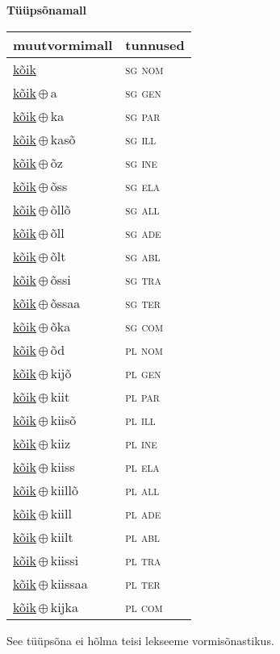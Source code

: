 

\vspace{3.5em}
\noindent \begin{minipage}{\textwidth}
\noindent \textbf{Tüüpsõnamall \,}\\

\begin{sideways}
\begin{tabular}{l l}
muutvormimall & tunnused \\
\hline
\underline{kõik} & \textsc{ sg nom } \\
\underline{kõik}\,$\oplus$\,a & \textsc{ sg gen } \\
\underline{kõik}\,$\oplus$\,ka & \textsc{ sg par } \\
\underline{kõik}\,$\oplus$\,kasõ & \textsc{ sg ill } \\
\underline{kõik}\,$\oplus$\,õz & \textsc{ sg ine } \\
\underline{kõik}\,$\oplus$\,õss & \textsc{ sg ela } \\
\underline{kõik}\,$\oplus$\,õllõ & \textsc{ sg all } \\
\underline{kõik}\,$\oplus$\,õll & \textsc{ sg ade } \\
\underline{kõik}\,$\oplus$\,õlt & \textsc{ sg abl } \\
\underline{kõik}\,$\oplus$\,õssi & \textsc{ sg tra } \\
\underline{kõik}\,$\oplus$\,õssaa & \textsc{ sg ter } \\
\underline{kõik}\,$\oplus$\,õka & \textsc{ sg com } \\
\underline{kõik}\,$\oplus$\,õd & \textsc{ pl nom } \\
\underline{kõik}\,$\oplus$\,kijõ & \textsc{ pl gen } \\
\underline{kõik}\,$\oplus$\,kiit & \textsc{ pl par } \\
\underline{kõik}\,$\oplus$\,kiisõ & \textsc{ pl ill } \\
\underline{kõik}\,$\oplus$\,kiiz & \textsc{ pl ine } \\
\underline{kõik}\,$\oplus$\,kiiss & \textsc{ pl ela } \\
\underline{kõik}\,$\oplus$\,kiillõ & \textsc{ pl all } \\
\underline{kõik}\,$\oplus$\,kiill & \textsc{ pl ade } \\
\underline{kõik}\,$\oplus$\,kiilt & \textsc{ pl abl } \\
\underline{kõik}\,$\oplus$\,kiissi & \textsc{ pl tra } \\
\underline{kõik}\,$\oplus$\,kiissaa & \textsc{ pl ter } \\
\underline{kõik}\,$\oplus$\,kijka & \textsc{ pl com } \\
\end{tabular}
\end{sideways}
\label{tab:tüüpsõnamall-kõik}

\end{minipage}

 
\vspace{1em}
\noindent See tüüpsõna ei hõlma teisi lekseeme vormi\-sõnastikus.
